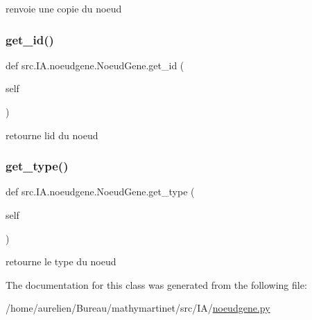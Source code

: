 renvoie une copie du noeud 

\mbox{\label{classsrc_1_1_i_a_1_1noeudgene_1_1_noeud_gene_ad907d09533995a0d76e4ebfff257e64c}} 
\subsubsection{\texorpdfstring{get\+\_\+id()}{get\_id()}}
{\footnotesize\ttfamily def src.\+I\+A.\+noeudgene.\+Noeud\+Gene.\+get\+\_\+id (\begin{DoxyParamCaption}\item[{}]{self }\end{DoxyParamCaption})}



retourne l\textquotesingle{}id du noeud 

\mbox{\label{classsrc_1_1_i_a_1_1noeudgene_1_1_noeud_gene_ad6ae0790a9b26993cb7a9c424e0645e6}} 
\subsubsection{\texorpdfstring{get\+\_\+type()}{get\_type()}}
{\footnotesize\ttfamily def src.\+I\+A.\+noeudgene.\+Noeud\+Gene.\+get\+\_\+type (\begin{DoxyParamCaption}\item[{}]{self }\end{DoxyParamCaption})}



retourne le type du noeud 



The documentation for this class was generated from the following file\+:\begin{DoxyCompactItemize}
\item 
/home/aurelien/\+Bureau/mathymartinet/src/\+I\+A/\hyperlink{noeudgene_8py}{noeudgene.\+py}\end{DoxyCompactItemize}
